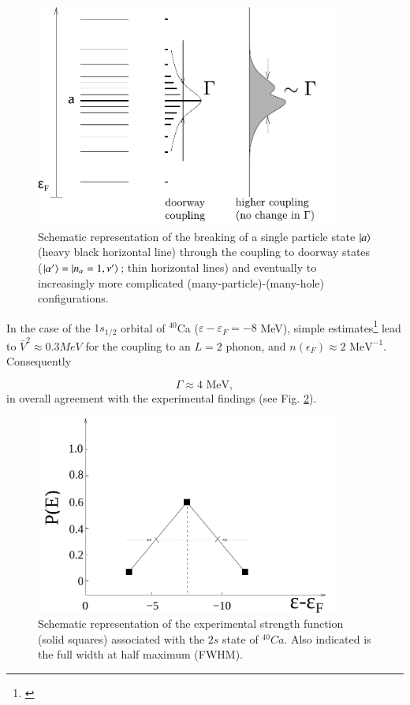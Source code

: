 \begin{figure}
\centerline {
\includegraphics*[width=10cm]{introduccion/figs/figintroD7}
}
\caption{Schematic representation of the breaking of a single particle state $|{a} \rangle$ (heavy black horizontal line) through the coupling to doorway states ($|{\alpha'} \rangle=|{n_\alpha=1,\nu'} \rangle$; thin horizontal lines) and eventually to increasingly more complicated (many-particle)-(many-hole) configurations.}
\label{fig:4.7}
\end{figure}

In the case of the $1s_{1/2}$ orbital of $^{40}$Ca ($\varepsilon - \varepsilon_F = -8$ MeV), simple estimates\footnote{\cite{Mahaux:85}} lead to $\bar{V}^2 \approx 0.3 MeV$ for the coupling to an $L=2$ phonon, and $n(\epsilon_F) \approx 2\text{ MeV}^{-1}$. Consequently

\begin{equation}
\Gamma \approx 4 \text{ MeV} ,
\label{eqn:46}
\end{equation}
in overall agreement with the experimental findings (see Fig. \ref{fig:4.8}).
\begin{figure}[h!]
\centerline {
\includegraphics*[width=10cm]{introduccion/figs/figintroD8}}
\caption{Schematic representation of the experimental strength function (solid squares) associated with the $2s$ state of $^{40}Ca$. Also indicated is the full width at half maximum (FWHM).}
\label{fig:4.8}
\end{figure}

